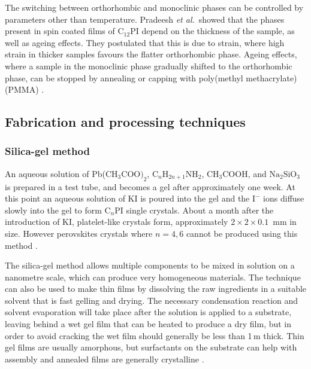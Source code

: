 
The switching between orthorhombic and monoclinic phases can be controlled by parameters other than temperature. Pradeesh \textit{et al.}\ showed that the phases present in spin coated films of $\textrm{C}_{12}$PI depend on the thickness of the sample, as well as ageing effects. They postulated that this is due to strain, where high strain in thicker samples favours the flatter orthorhombic phase. Ageing effects, where a sample in the monoclinic phase gradually shifted to the orthorhombic phase, can be stopped by annealing or capping with poly(methyl methacrylate) (PMMA) \cite{Pradeesh2009}.

\subsection{Fabrication and processing techniques}
\subsubsection{Silica-gel method}
An aqueous solution of Pb($\textrm{CH}_3 \textrm{COO)}_2$, $\textrm{C}_n\textrm{H}_{2n+1}\textrm{NH}_2$, $\textrm{CH}_3$COOH, and $\textrm{Na}_2\textrm{SiO}_3$ is prepared in a test tube, and becomes a gel after approximately one week. At this point an aqueous solution of KI is poured into the gel and the $\textrm{I}^-$ ions diffuse slowly into the gel to form $\textrm{C}_n$PI single crystals. About a month after the introduction of KI, platelet-like crystals form, approximately $2\times 2\times 0.1$~mm in size. However perovskites crystals where $n=4,6$ cannot be produced using this method \cite{Ishihara1990}.

The silica-gel method allows multiple components to be mixed in solution on a nanometre scale, which can produce very homogeneous materials. The technique can also be used to make thin films by dissolving the raw ingredients in a suitable solvent that is fast gelling and drying. The necessary condensation reaction and solvent evaporation will take place after the solution is applied to a substrate, leaving behind a wet gel film that can be heated to produce a dry film, but in order to avoid cracking the wet film should generally be less than 1\,\textmu m thick. Thin gel films are usually amorphous, but surfactants on the substrate can help with assembly and annealed films are generally crystalline \cite{Mitzi2001b}.

